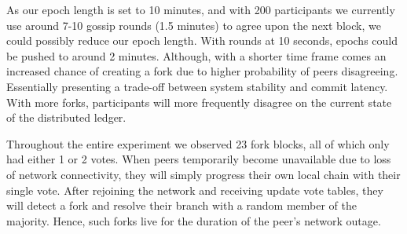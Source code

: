 \documentclass[USenglish]{uit-thesis}
\begin{document}
As our epoch length is set to 10 minutes, and with 200 participants we currently use around 7-10 gossip rounds (1.5 minutes) to agree upon the next block, we could possibly reduce our epoch length.
With rounds at 10 seconds, epochs could be pushed to around 2 minutes.
Although, with a shorter time frame comes an increased chance of creating a fork due to higher probability of peers disagreeing.
Essentially presenting a trade-off between system stability and commit latency.
With more forks, participants will more frequently disagree on the current state of the distributed ledger.



Throughout the entire experiment we observed 23 fork blocks, all of which only had either 1 or 2 votes.
When peers temporarily become unavailable due to loss of network connectivity, they will simply progress their own local chain with their single vote.
After rejoining the network and receiving update vote tables, they will detect a fork and resolve their branch with a random member of the majority.
Hence, such forks live for the duration of the peer's network outage.

 


 
\end{document}

